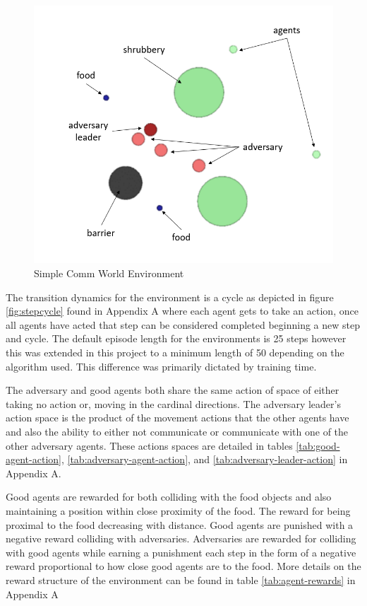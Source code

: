 \documentclass{article}
\begin{document}
\begin{figure}[!ht]
  \centering
  \includegraphics[scale=0.25]{simple_comm_environment.png}
  \caption{Simple Comm World Environment}
  \label{fig:simple_comm_world}
\end{figure}


The transition dynamics for the environment is a cycle as depicted in figure \ref{fig:stepcycle} found in Appendix A where each agent gets to take an action, once all agents have acted that step can be considered completed beginning a new step and cycle.
The default episode length for the environments is 25 steps however this was extended in this project to a minimum length of 50 depending on the algorithm used. 
This difference was primarily dictated by training time.

The adversary and good agents both share the same action of space of either taking no action or, moving in the cardinal directions.
The adversary leader's action space is the product of the movement actions that the other agents have and also the ability to either not communicate or communicate with one of the other adversary agents.
These actions spaces are detailed in tables \ref{tab:good-agent-action}, \ref{tab:adversary-agent-action}, and \ref{tab:adversary-leader-action} in Appendix A.

Good agents are rewarded for both colliding with the food objects and also maintaining a position within close proximity of the food.
The reward for being proximal to the food decreasing with distance.
Good agents are punished with a negative reward colliding with adversaries.
Adversaries are rewarded for colliding with good agents while earning a punishment each step in the form of a negative reward proportional to how close good agents are to the food.
More details on the reward structure of the environment can be found in table \ref{tab:agent-rewards} in Appendix A
\end{document}
